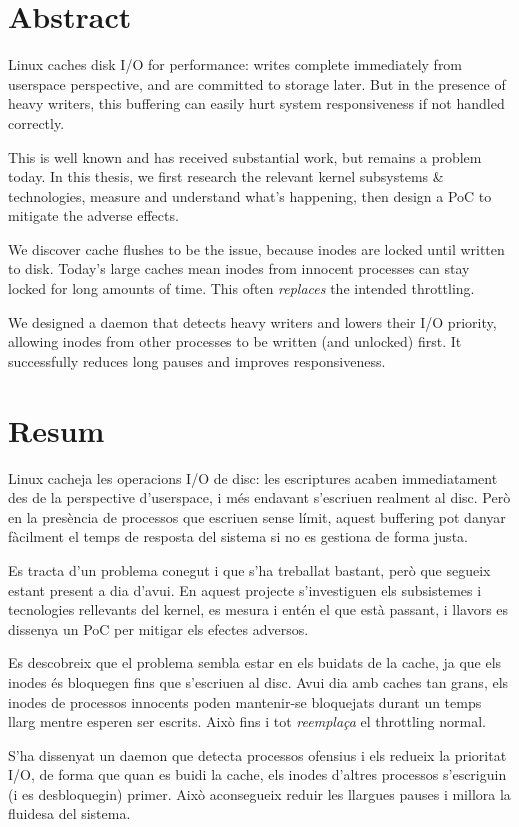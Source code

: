 \documentclass[a4paper,12pt]{article}
\begin{document}
\newpage
\section*{Abstract}

Linux caches disk I/O for performance: writes complete immediately from userspace perspective, and are committed to storage later.
But in the presence of heavy writers, this buffering can easily hurt system responsiveness if not handled correctly.

This is well known and has received substantial work, but remains a problem today. In this thesis, we first research the relevant kernel subsystems \& technologies, measure and understand what's happening, then design a PoC to mitigate the adverse effects.

We discover cache flushes to be the issue, because inodes are locked until written to disk. Today's large caches mean inodes from innocent processes can stay locked for long amounts of time. This often \emph{replaces} the intended throttling.

We designed a daemon that detects heavy writers and lowers their I/O priority, allowing inodes from other processes to be written (and unlocked) first. It successfully reduces long pauses and improves responsiveness.

\newpage
\section*{Resum}

\begin{otherlanguage}{catalan}
Linux cacheja les operacions I/O de disc: les escriptures acaben immediatament des de la perspective d'userspace, i més endavant s'escriuen realment al disc. Però en la presència de processos que escriuen sense límit, aquest buffering pot danyar fàcilment el temps de resposta del sistema si no es gestiona de forma justa.

Es tracta d'un problema conegut i que s'ha treballat bastant, però que segueix estant present a dia d'avui. En aquest projecte s'investiguen els subsistemes i tecnologies rellevants del kernel, es mesura i entén el que està passant, i llavors es dissenya un PoC per mitigar els efectes adversos.

Es descobreix que el problema sembla estar en els buidats de la cache, ja que els inodes és bloquegen fins que s'escriuen al disc. Avui dia amb caches tan grans, els inodes de processos innocents poden mantenir-se bloquejats durant un temps llarg mentre esperen ser escrits. Això fins i tot \emph{reemplaça} el throttling normal.

S'ha dissenyat un daemon que detecta processos ofensius i els redueix la prioritat I/O, de forma que quan es buidi la cache, els inodes d'altres processos s'escriguin (i es desbloquegin) primer. Això aconsegueix reduir les llargues pauses i millora la fluidesa del sistema.
\end{otherlanguage}
\end{document}
